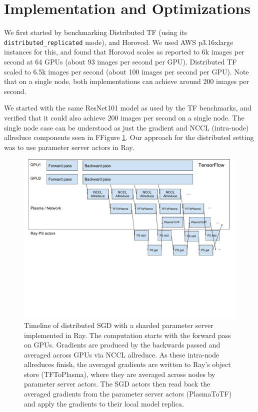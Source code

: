 \section{Implementation and Optimizations}
We first started by benchmarking Distributed TF (using its \texttt{distributed\_replicated} mode), and Horovod. We used AWS p3.16xlarge instances for this, and found that Horovod scales as reported to 6k images per second at 64 GPUs (about 93 images per second per GPU). Distributed TF scaled to 6.5k images per second (about 100 images per second per GPU). Note that on a single node, both implementations can achieve around 200 images per second.

We started with the same ResNet101 model as used by the TF benchmarks, and verified that it could also achieve 200 images per second on a single node. The single node case can be understood as just the gradient and NCCL (intra-node) allreduce components seen in FFigure \ref{fig:pipeline}. Our approach for the distributed setting was to use parameter server actors in Ray.

\begin{figure}
    \centering
    \includegraphics[width=5.1in,keepaspectratio]{fig/pipeline.pdf}
    \caption{
    \small{
        Timeline of distributed SGD with a sharded parameter server implemented in Ray. The computation starts with the forward pass on GPUs. Gradients are produced by the backwards passed and averaged across GPUs via NCCL allreduce. As these intra-node allreduces finish, the averaged gradients are written to Ray's object store (TFToPlasma), where they are averaged across nodes by parameter server actors. The SGD actors then read back the averaged gradients from the parameter server actors (PlasmaToTF) and apply the gradients to their local model replica.
    }
    }
    \label{fig:pipeline}
\end{figure}

